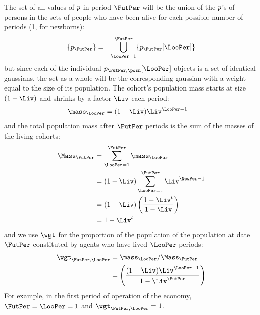 \documentclass[../BufferStockTheory.tex]{subfiles}\usepackage{ApndxSteadyState}
\begin{document}
  \newpage
  The set of all values of $p$ in period $\FutPer$ will be the union of the $p$'s of persons in the sets of people who have been alive for each possible number of periods (1, for newborns):
  \begin{eqnarray}
    \{\pLog_{\FutPer}\} & = & \bigcup_{\LooPer=1}^{\FutPer}\{\pLog_{\FutPer}[\LooPer]\}
  \end{eqnarray}
  but since each of the individual $\pLog_{\FutPer,\posn}[\LooPer]$ objects is a set of identical gaussians, the set as a whole will be the corresponding gaussian with a weight equal to the size of its population.  The cohort's population mass starts at size $(1-\Liv)$ and shrinks by a factor $\Liv$ each period:
  \begin{equation}\begin{gathered}\begin{aligned}
    \mass_{\LooPer} & =  (1-\Liv)\Liv^{\LooPer-1} \label{eq:mass}
  \end{aligned}\end{gathered}\end{equation}
  and the total population mass after $\FutPer$ periods is the sum of the masses of the living cohorts:
  \begin{equation}\begin{gathered}\begin{aligned}
    \Mass_{\FutPer} & =  \sum_{\LooPer=1}^{\FutPer}\mass_{\LooPer}
    \\ & =  (1-\Liv)\sum_{\LooPer=1}^{\FutPer}\Liv^{\NewPer-1}
    \\ & =  (1-\Liv)\left(\frac{1-\Liv^{t}}{1-\Liv}\right)
    \\ & = 1-\Liv^{t}
  \end{aligned}\end{gathered}\end{equation}
  and we use $\wgt$ for the proportion of the population of the population at date $\FutPer$ constituted by agents who have lived $\LooPer$ periods:
  \begin{equation}\begin{gathered}\begin{aligned}
    \wgt_{\FutPer,\LooPer} & =  \mass_{\LooPer}/\Mass_{\FutPer}
    \\ & = \left(\frac{(1-\Liv)\Liv^{\LooPer-1}}{1-\Liv^{\FutPer}}\right) \label{eq:wgt}
  \end{aligned}\end{gathered}\end{equation}
  For example, in the first period of operation of the economy, $\FutPer=\LooPer=1$ and $\wgt_{\FutPer,\LooPer}=1$.
\end{document}
